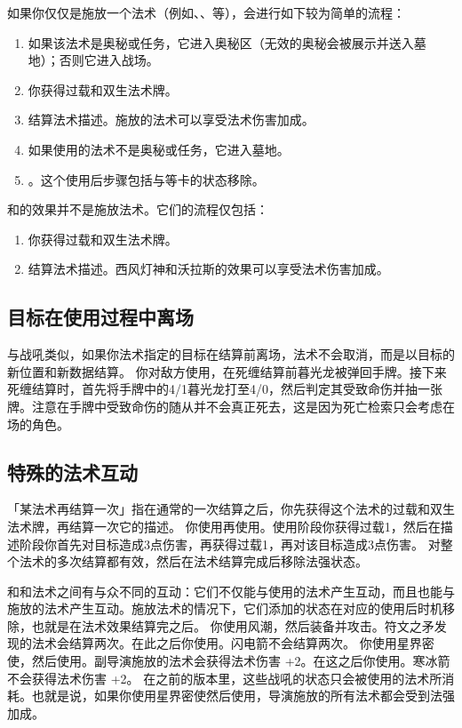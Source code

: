 如果你仅仅是施放一个法术（例如、、等），会进行如下较为简单的流程：
\begin{enumerate}
    \item 如果该法术是奥秘或任务，它进入奥秘区（无效的奥秘会被展示并送入墓地）；否则它进入战场。
    \item 你获得过载和双生法术牌。
    \item 结算法术描述。施放的法术可以享受法术伤害加成。
    \item 如果使用的法术不是奥秘或任务，它进入墓地。
    \item {}。这个使用后步骤包括与等卡的状态移除。
\end{enumerate}

和的效果并不是施放法术。它们的流程仅包括：
\begin{enumerate}
    \item 你获得过载和双生法术牌。
    \item 结算法术描述。西风灯神和沃拉斯的效果可以享受法术伤害加成。
\end{enumerate}


\subsection{目标在使用过程中离场}

与战吼类似，如果你法术指定的目标在结算前离场，法术不会取消，而是以目标的新位置和新数据结算。
\example 你对敌方使用，在死缠结算前暮光龙被弹回手牌。接下来死缠结算时，首先将手牌中的4/1暮光龙打至4/0，然后判定其受致命伤并抽一张牌。注意在手牌中受致命伤的随从并不会真正死去，这是因为死亡检索只会考虑在场的角色。

\subsection{特殊的法术互动}

「某法术再结算一次」指在通常的一次结算之后，你先获得这个法术的过载和双生法术牌，再结算一次它的描述。
\example 你使用再使用。使用阶段你获得过载1，然后在描述阶段你首先对目标造成3点伤害，再获得过载1，再对该目标造成3点伤害。
\notice {}对整个法术的多次结算都有效，然后在法术结算完成后移除法强状态。

和和法术之间有与众不同的互动：它们不仅能与使用的法术产生互动，而且也能与施放的法术产生互动。施放法术的情况下，它们添加的状态在对应的使用后时机移除，也就是在法术效果结算完之后。
\example {}你使用风潮，然后装备并攻击。符文之矛发现的法术会结算两次。在此之后你使用。闪电箭不会结算两次。
\example {}你使用星界密使，然后使用。副导演施放的法术会获得法术伤害 +2。在这之后你使用。寒冰箭不会获得法术伤害 +2。
\notice 在之前的版本里，这些战吼的状态只会被使用的法术所消耗。也就是说，如果你使用星界密使然后使用，导演施放的所有法术都会受到法强加成。

